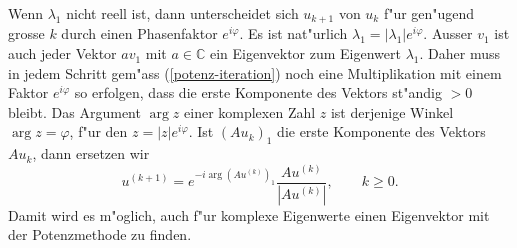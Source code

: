 Wenn $\lambda_1$ nicht reell ist, dann unterscheidet sich $u_{k+1}$ von $u_k$
f"ur gen"ugend grosse $k$ durch einen Phasenfaktor $e^{i\varphi}$.
Es ist nat"urlich $\lambda_1 = |\lambda_1|e^{i\varphi}$.
Ausser $v_1$ ist auch jeder Vektor $av_1$ mit $a\in\mathbb C$ ein
Eigenvektor zum Eigenwert $\lambda_1$.
Daher muss in jedem Schritt gem"ass (\ref{potenz-iteration}) noch eine
Multiplikation mit einem Faktor $e^{i\varphi}$ so erfolgen, dass die
erste Komponente des Vektors st"andig $> 0$ bleibt.
Das Argument $\arg z$ einer komplexen Zahl $z$ ist derjenige Winkel
$\arg z=\varphi$, f"ur den $z=|z|e^{i\varphi}$.
Ist $(Au_k)_1$ die erste Komponente des Vektors $Au_k$, dann ersetzen wir
\begin{equation}
u^{(k+1)}=e^{-i\arg (Au^{(k)})_1}\frac{Au^{(k)}}{|Au^{(k)}|},\qquad k\ge 0.
\label{potenz-komplex}
\end{equation}
Damit wird es m"oglich, auch f"ur komplexe Eigenwerte einen Eigenvektor
mit der Potenzmethode zu finden.

